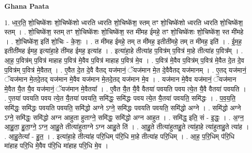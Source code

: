 \documentclass[17pt]{extarticle}
\begin{document}
\textbf{Ghana Paata } \newline

1. ध्व॒र॒ति॒ शो॒चिष्के॑शः शो॒चिष्के॑शो ध्वरति ध्वरति शो॒चिष्के॑श॒ स्तम् तꣳ शो॒चिष्के॑शो ध्वरति ध्वरति शो॒चिष्के॑श॒ स्तम् । . शो॒चिष्के॑श॒ स्तम् तꣳ शो॒चिष्के॑शः शो॒चिष्के॑श॒ स्त मी॑मह ईमहे॒ तꣳ शो॒चिष्के॑शः शो॒चिष्के॑श॒ स्त मी॑महे । . शो॒चिष्के॑श॒ इति॑ शो॒चिः - के॒शः॒ । . त मी॑मह ईमहे॒ तम् त मी॑मह॒ इतीती॑महे॒ तम् त मी॑मह॒ इति॑ । . ई॒म॒ह॒ इतीती॑मह ईमह॒ इत्या॑हा॒हे ती॑मह ईमह॒ इत्या॑ह । . इत्या॑हा॒हे तीत्या॑ह प॒वित्र॑म् प॒वित्र॑ मा॒हे तीत्या॑ह प॒वित्र᳚म् । . आ॒ह॒ प॒वित्र॑म् प॒वित्र॑ माहाह प॒वित्र॑ मे॒वैव प॒वित्र॑ माहाह प॒वित्र॑ मे॒व । . प॒वित्र॑ मे॒वैव प॒वित्र॑म् प॒वित्र॑ मे॒वैत दे॒त दे॒व प॒वित्र॑म् प॒वित्र॑ मे॒वैतत् । . ए॒वैत दे॒त दे॒वै वैतद् यज॑मानं॒ ॅयज॑मान मे॒त दे॒वैवैतद् यज॑मानम् । . ए॒तद् यज॑मानं॒ ॅयज॑मान मे॒तदे॒तद् यज॑मान मे॒वैव यज॑मान मे॒तदे॒तद् यज॑मान मे॒व । . यज॑मान मे॒वैव यज॑मानं॒ ॅयज॑मान मे॒वैत यै॒त यै॒व यज॑मानं॒ ॅयज॑मान मे॒वैतया᳚ । . ए॒वैत यै॒त यै॒वै वैतया॑ पवयति पवय त्ये॒त यै॒वै वैतया॑ पवयति । . ए॒तया॑ पवयति पवय त्ये॒त यै॒तया॑ पवयति॒ समि॑द्धः॒ समि॑द्धः पवय त्ये॒त यै॒तया॑ पवयति॒ समि॑द्धः । . प॒व॒य॒ति॒ समि॑द्धः॒ समि॑द्धः पवयति पवयति॒ समि॑द्धो अग्ने ऽग्ने॒ समि॑द्धः पवयति पवयति॒ समि॑द्धो अग्ने । . समि॑द्धो अग्ने ऽग्ने॒ समि॑द्धः॒ समि॑द्धो अग्न आहुता हुताग्ने॒ समि॑द्धः॒ समि॑द्धो अग्न आहुत । . समि॑द्ध॒ इति॒ सं - इ॒द्धः॒ । . अ॒ग्न॒ आ॒हु॒ता॒ हु॒ता॒ग्ने॒ ऽग्न॒ आ॒हु॒ते तीत्या॑हुताग्ने ऽग्न आहु॒ते ति॑ । . आ॒हु॒ते तीत्या॑हुताहु॒ते त्या॑हा॒हे त्या॑हुताहु॒ते त्या॑ह । . आ॒हु॒तेत्या᳚ - हु॒त॒ । . इत्या॑हा॒हे तीत्या॑ह परि॒धिम् प॑रि॒धि मा॒हे तीत्या॑ह परि॒धिम् । . आ॒ह॒ प॒रि॒धिम् प॑रि॒धि मा॑हाह परि॒धि मे॒वैव प॑रि॒धि मा॑हाह परि॒धि मे॒व । \newline
\end{document}
